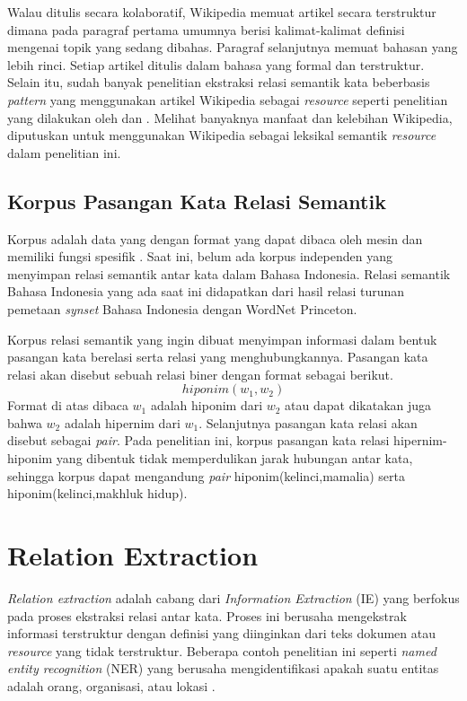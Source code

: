Walau ditulis secara kolaboratif, Wikipedia memuat artikel secara terstruktur dimana pada paragraf pertama umumnya berisi kalimat-kalimat definisi mengenai topik yang sedang dibahas. Paragraf selanjutnya memuat bahasan yang lebih rinci. Setiap artikel ditulis dalam bahasa yang formal dan terstruktur. Selain itu, sudah banyak penelitian ekstraksi relasi semantik kata beberbasis \textit{pattern} yang menggunakan artikel Wikipedia sebagai \textit{resource} seperti penelitian yang dilakukan oleh \cite{ruiz2005automatic} dan \cite{arnold2014extracting}. Melihat banyaknya manfaat dan kelebihan Wikipedia, diputuskan untuk menggunakan Wikipedia sebagai leksikal semantik \textit{resource} dalam penelitian ini. 


\subsection{Korpus Pasangan Kata Relasi Semantik}
Korpus adalah data yang dengan format yang dapat dibaca oleh mesin dan memiliki fungsi spesifik \citep{atkins1992corpus}. Saat ini, belum ada korpus independen yang menyimpan relasi semantik antar kata dalam Bahasa Indonesia. Relasi semantik Bahasa Indonesia yang ada saat ini didapatkan dari hasil relasi turunan pemetaan \textit{synset} Bahasa Indonesia dengan WordNet Princeton. 

Korpus relasi semantik yang ingin dibuat menyimpan informasi dalam bentuk pasangan kata berelasi serta relasi yang menghubungkannya. Pasangan kata relasi akan disebut sebuah relasi biner dengan format sebagai berikut.
\[ hiponim(w_1,w_2) \]
\noindent Format di atas dibaca $w_1$ adalah hiponim dari $w_2$ atau dapat dikatakan juga bahwa $w_2$ adalah hipernim dari $w_1$. Selanjutnya pasangan kata relasi akan disebut sebagai \textit{pair}. Pada penelitian ini, korpus pasangan kata relasi hipernim-hiponim yang dibentuk tidak memperdulikan jarak hubungan antar kata, sehingga korpus dapat mengandung \textit{pair} hiponim(kelinci,mamalia) serta hiponim(kelinci,makhluk hidup).


\section{Relation Extraction}
\textit{Relation extraction} adalah cabang dari \textit{Information Extraction} (IE) yang berfokus pada proses ekstraksi relasi antar kata. Proses ini berusaha mengekstrak informasi terstruktur dengan definisi yang diinginkan dari teks dokumen atau \textit{resource} yang tidak terstruktur. Beberapa contoh penelitian ini seperti \textit{named entity recognition} (NER) yang berusaha mengidentifikasi apakah suatu entitas adalah orang, organisasi, atau lokasi \citep{bikel1999algorithm}. 

